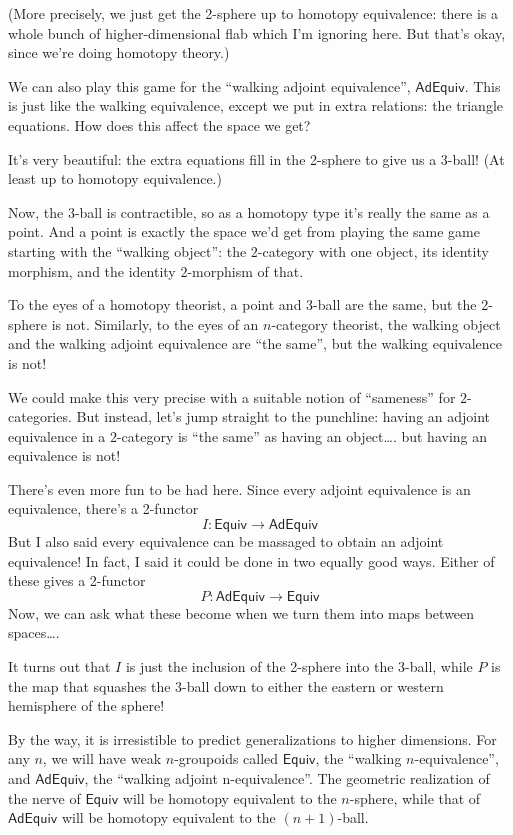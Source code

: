 \documentclass{article}
\begin{document}
(More precisely, we just get the 2-sphere up to homotopy equivalence:
there is a whole bunch of higher-dimensional flab which I'm ignoring
here. But that's okay, since we're doing homotopy theory.)

We can also play this game for the ``walking adjoint equivalence'',
\(\mathsf{AdEquiv}\). This is just like the walking equivalence, except
we put in extra relations: the triangle equations. How does this affect
the space we get?

It's very beautiful: the extra equations fill in the 2-sphere to give us
a 3-ball! (At least up to homotopy equivalence.)

Now, the 3-ball is contractible, so as a homotopy type it's really the
same as a point. And a point is exactly the space we'd get from playing
the same game starting with the ``walking object'': the \(2\)-category
with one object, its identity morphism, and the identity \(2\)-morphism
of that.

To the eyes of a homotopy theorist, a point and 3-ball are the same, but
the 2-sphere is not. Similarly, to the eyes of an \(n\)-category
theorist, the walking object and the walking adjoint equivalence are
``the same'', but the walking equivalence is not!

We could make this very precise with a suitable notion of ``sameness''
for \(2\)-categories. But instead, let's jump straight to the punchline:
having an adjoint equivalence in a \(2\)-category is ``the same'' as
having an object\ldots. but having an equivalence is not!

There's even more fun to be had here. Since every adjoint equivalence is
an equivalence, there's a 2-functor
\[I\colon \mathsf{Equiv} \to \mathsf{AdEquiv}\] But I also said every
equivalence can be massaged to obtain an adjoint equivalence! In fact, I
said it could be done in two equally good ways. Either of these gives a
2-functor \[P\colon \mathsf{AdEquiv} \to \mathsf{Equiv}\] Now, we can
ask what these become when we turn them into maps between spaces\ldots.

It turns out that \(I\) is just the inclusion of the 2-sphere into the
3-ball, while \(P\) is the map that squashes the 3-ball down to either
the eastern or western hemisphere of the sphere!

By the way, it is irresistible to predict generalizations to higher
dimensions. For any \(n\), we will have weak \(n\)-groupoids called
\(\mathsf{Equiv}\), the ``walking \(n\)-equivalence'', and
\(\mathsf{AdEquiv}\), the ``walking adjoint n-equivalence''. The
geometric realization of the nerve of \(\mathsf{Equiv}\) will be
homotopy equivalent to the \(n\)-sphere, while that of
\(\mathsf{AdEquiv}\) will be homotopy equivalent to the \((n+1)\)-ball.
\end{document}
